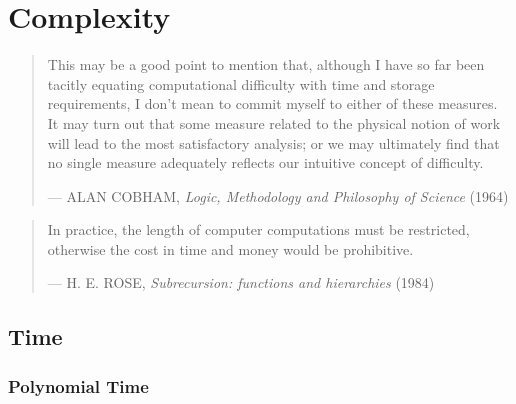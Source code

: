 
\chapter{Complexity}

\begin{quotation}

\footnotesize\sffamily\itshape

\begin{flushright}

This may be a good point to mention that, although I have so far been tacitly
equating computational difficulty with time and storage requirements, I don't
mean to commit myself to either of these measures. It may turn out that some
measure related to the physical notion of work will lead to the most
satisfactory analysis; or we may ultimately find that no single measure
adequately reflects our intuitive concept of difficulty.

\smallbreak

\upshape

--- ALAN COBHAM, {\itshape Logic, Methodology and Philosophy of Science} (1964)

\end{flushright}

\end{quotation}

\begin{quotation}

\footnotesize\sffamily\itshape

\begin{flushright}

In practice, the length of computer computations must be restricted, otherwise
the cost in time and money would be prohibitive.

\smallbreak

\upshape

--- H. E. ROSE, {\itshape Subrecursion: functions and hierarchies} (1984)

\end{flushright}

\end{quotation}


\section{Time}

\subsection{Polynomial Time}

